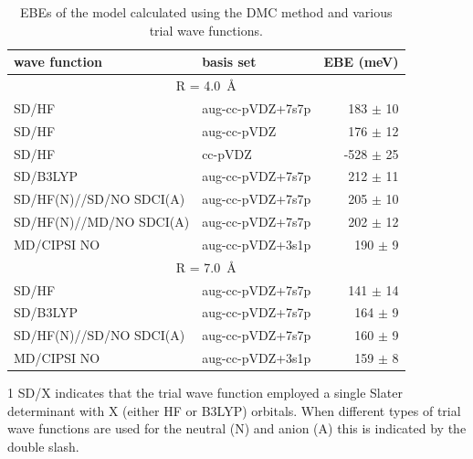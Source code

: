 \begin{table}
    \begin{threeparttable}
        \caption{\label{tab:DMC} EBEs of the  model calculated using the DMC method and various trial wave functions.}
\begin{tabular*}{\textwidth}{l@{\extracolsep{\fill}}lr}
wave function                  & basis set        &  EBE (meV) \\ \hline
\multicolumn{3}{c}{R = \SI{4.0}{\angstrom}}               \\ 
SD/HF                         & aug-cc-pVDZ+7s7p &  183 $\pm$ 10 \\
SD/HF                         & aug-cc-pVDZ      &  176 $\pm$ 12 \\
SD/HF                         & cc-pVDZ          & -528 $\pm$ 25 \\ 
SD/B3LYP                      & aug-cc-pVDZ+7s7p &  212 $\pm$ 11 \\
SD/HF(N)//SD/NO SDCI(A)    & aug-cc-pVDZ+7s7p &  205 $\pm$ 10 \\
SD/HF(N)//MD/NO SDCI(A)    & aug-cc-pVDZ+7s7p &  202 $\pm$ 12 \\
MD/CIPSI NO                   & aug-cc-pVDZ+3s1p &  190 $\pm$ 9  \\ \hline
\multicolumn{3}{c}{R = \SI{7.0}{\angstrom}}                    \\ 
SD/HF                         & aug-cc-pVDZ+7s7p &   141 $\pm$ 14 \\ 
SD/B3LYP                      & aug-cc-pVDZ+7s7p &   164 $\pm$ 9 \\
SD/HF(N)//SD/NO SDCI(A)    & aug-cc-pVDZ+7s7p &  160 $\pm$ 9 \\
MD/CIPSI NO                   & aug-cc-pVDZ+3s1p &    159 $\pm$ 8 \\
\end{tabular*}
\begin{tablenotes}
  \item [1] SD/X indicates that the trial wave function employed a single Slater determinant with X (either HF or B3LYP) orbitals. When different types of trial wave functions are used for the neutral (N) and anion (A) this is indicated by the double slash.
\end{tablenotes}
\end{threeparttable}
\end{table}

